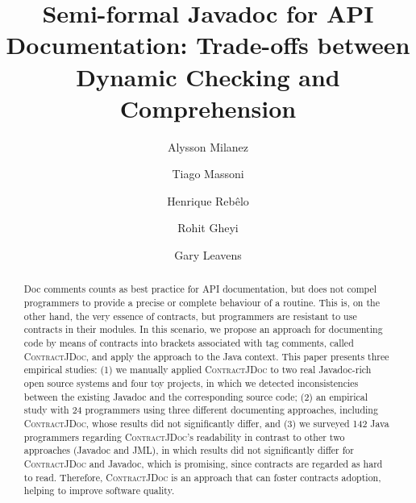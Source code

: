\documentclass[a4paper,UKenglish]{lipics-v2018}
\title{Semi-formal Javadoc for API Documentation: Trade-offs between Dynamic Checking and Comprehension}
\author{Alysson Milanez}{Department of Systems and Computing, UFCG, Brazil}{alyssonfilgueira@copin.ufcg.edu.br}{}{}
\author{Tiago Massoni}{Department of Systems and Computing, UFCG, Brazil}{massoni@dsc.ufcg.edu.br}{}{}
\author{Henrique Reb\^{e}lo}{Informatics Center, UFPE, Brazil}{hemr@cin.ufpe.br}{}{}
\author{Rohit Gheyi}{Department of Systems and Computing, UFCG, Brazil}{rohit@dsc.ufcg.edu.br}{}{}
\author{Gary Leavens}{Department of Computer Science, UCF, USA}{leavens@cs.ucf.edu}{}{}
\newcommand{\contractjdoc}[1]{\textsc{ContractJDoc}}
\begin{document}
\maketitle

\begin{abstract}
Doc comments counts as best practice for API documentation, but does not compel
programmers to provide a precise or complete behaviour of a routine.
%
This is, on the other hand, the very essence of contracts, but programmers are resistant to use contracts in their modules.
%
In this scenario, we propose
an approach for documenting code by means of contracts into brackets associated
with tag comments, called \contractjdoc{}, and apply the approach to the Java context.
This paper presents three empirical studies:
(1) we manually applied \contractjdoc{} to two real Javadoc-rich open source
systems and four toy projects, in which we detected inconsistencies between
the existing Javadoc and the corresponding source code; (2) an empirical study
with 24 programmers using three different documenting approaches, including
\contractjdoc{}, whose results did not significantly differ, and (3) we surveyed 142 Java programmers regarding \contractjdoc{}'s
readability in contrast to other two approaches (Javadoc and JML), in which
results did not significantly differ for \contractjdoc{} and Javadoc, which is
promising, since contracts are regarded as hard to read.
Therefore, \contractjdoc{} is an approach that can foster contracts adoption,
helping to improve software quality.
\end{abstract}











\end{document}
